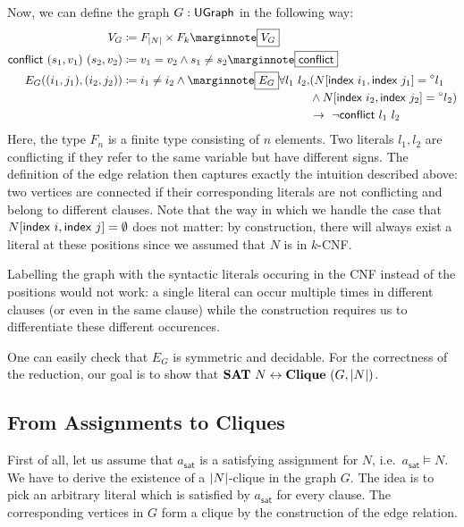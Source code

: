 \newcommand{\literalsConflict}{\textsf{conflict}}
Now, we can define the graph $G : \textsf{UGraph}$ in the following way: 
\begin{align*} 
  V_G &\defeq F_{\length{N}} \times F_{k}\mnote{$V_G$} \\
  \literalsConflict~(s_1, v_1)~(s_2, v_2) &\defeq v_1 = v_2 \land s_1 \neq s_2\mnote{\literalsConflict}\\
  E_G ((i_1, j_1), (i_2, j_2)) &\defeq i_1 \neq i_2 \land \mnote{$E_G$}
  \begin{aligned}[t]
    \forall l_1~l_2, &(N[\findex{i_1}, \findex{j_1}] = \OSome{l_1} \\
                     &\land N[\findex{i_2}, \findex{j_2}] = \OSome{l_2}) \\
                     &\rightarrow~\lnot \literalsConflict~l_1~l_2 
  \end{aligned}
\end{align*}
Here, the type $F_n$ is a finite type consisting of $n$ elements. Two literals $l_1, l_2$ are conflicting if they refer to the same variable but have different signs. 
The definition of the edge relation then captures exactly the intuition described above: two vertices are connected if their corresponding literals are not conflicting and belong to different clauses. 
Note that the way in which we handle the case that $N[\textsf{index}~i, \textsf{index}~j] = \emptyset$ does not matter: by construction, there will always exist a literal at these positions since we assumed that $N$ is in $k$-CNF.

\begin{remark}
  Labelling the graph with the syntactic literals occuring in the CNF instead of the positions would not work: a single literal can occur multiple times in different clauses (or even in the same clause) while the construction requires us to differentiate these different occurences. 
\end{remark}

One can easily check that $E_G$ is symmetric and decidable.
For the correctness of the reduction, our goal is to show that $\textbf{SAT}{}~N \leftrightarrow \textbf{Clique}{}~(G, |N|)$. 

\subsection{From Assignments to Cliques}
First of all, let us assume that $a_\textsf{sat}$ is a satisfying assignment for $N$, i.e.\ $a_\textsf{sat} \models N$. 
We have to derive the existence of a $|N|$-clique in the graph $G$. The idea is to pick an arbitrary literal which is satisfied by $a_\textsf{sat}$ for every clause. The corresponding vertices in $G$ form a clique by the construction of the edge relation. 

